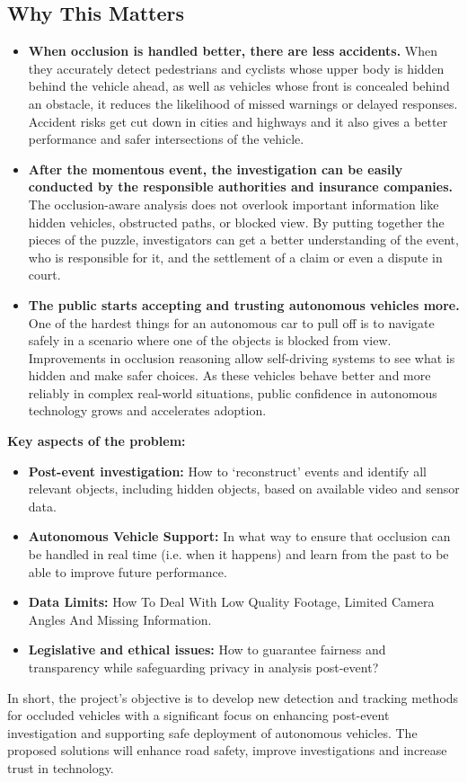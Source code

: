 \documentclass[12pt,a4paper]{report}
\theoremstyle{definition}
\theoremstyle{remark}
\begin{document}
\subsection{Why This Matters}
\begin{itemize}
    \item \textbf{When occlusion is handled better, there are less accidents.}  
    When they accurately detect pedestrians and cyclists whose upper body is hidden behind the vehicle ahead, as well as vehicles whose front is concealed behind an obstacle, it reduces the likelihood of missed warnings or delayed responses. Accident risks get cut down in cities and highways and it also gives a better performance and safer intersections of the vehicle.

    \item \textbf{After the momentous event, the investigation can be easily conducted by the responsible authorities and insurance companies.}  
    The occlusion-aware analysis does not overlook important information like hidden vehicles, obstructed paths, or blocked view. By putting together the pieces of the puzzle, investigators can get a better understanding of the event, who is responsible for it, and the settlement of a claim or even a dispute in court.

    \item \textbf{The public starts accepting and trusting autonomous vehicles more.}  
    One of the hardest things for an autonomous car to pull off is to navigate safely in a scenario where one of the objects is blocked from view.
 Improvements in occlusion reasoning allow self-driving systems to see what is hidden and make safer choices. As these vehicles behave better and more reliably in complex real-world situations, public confidence in autonomous technology grows and accelerates adoption.
\end{itemize}

\noindent \textbf{Key aspects of the problem:}
\begin{itemize}
    \item \textbf{Post-event investigation:} How to ‘reconstruct’ events and identify all relevant objects, including hidden objects, based on available video and sensor data.
    \item \textbf{Autonomous Vehicle Support:} In what way to ensure that occlusion can be handled in real time (i.e. when it happens) and learn from the past to be able to improve future performance.
    \item \textbf{Data Limits:} How To Deal With Low Quality Footage, Limited Camera Angles And Missing Information.
    \item \textbf{Legislative and ethical issues:} How to guarantee fairness and transparency while safeguarding privacy in analysis post-event?
\end{itemize}
In short, the project’s objective is to develop new detection and tracking methods for occluded vehicles with a significant focus on enhancing post-event investigation and supporting safe deployment of autonomous vehicles. The proposed solutions will enhance road safety, improve investigations and increase trust in technology.
\end{document}

